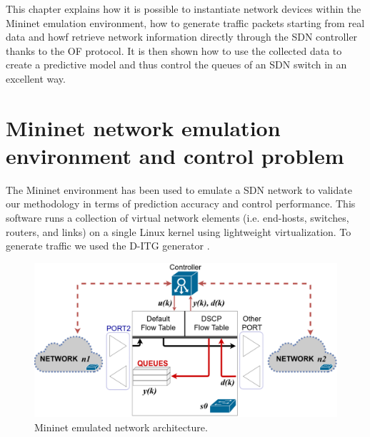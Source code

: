 This chapter explains how it is possible to instantiate network devices within the Mininet emulation environment, how to generate traffic packets starting from real data and howf retrieve network information directly through the SDN controller thanks to the OF protocol. It is then shown how to use the collected data to create a predictive model and thus control the queues of an SDN switch in an excellent way.

\section{Mininet network emulation environment and control problem} \label{sec:SDNNetSim}
The Mininet environment \cite{Mininet} has been used to emulate a SDN network to validate our methodology in terms of prediction accuracy and control performance. This software runs a collection of virtual network elements (i.e. end-hosts, switches, routers, and links) on a single Linux kernel using lightweight virtualization. 
To generate traffic we used the D-ITG generator \cite{Avallone2004, Botta2012, Botta2013}.

\begin{figure}[tb!]
	\centering
	\includegraphics[keepaspectratio,width=\columnwidth]{figure/SDN_net_EPS.eps}
	\caption{Mininet emulated network architecture.}
	\label{fig:{Network}}
\end{figure}


